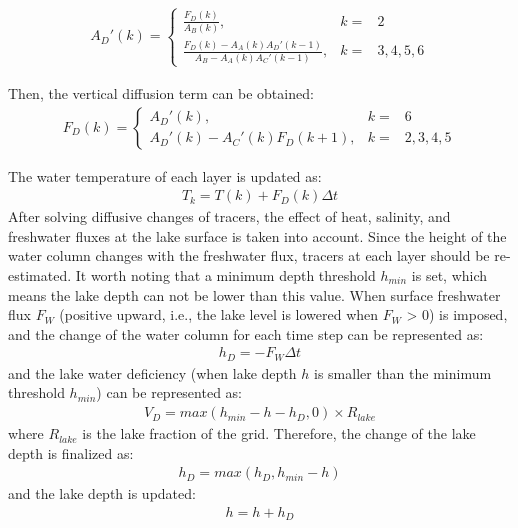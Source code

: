 \begin{eqnarray}
A_{D}'(k)=\left\{\begin{matrix}
\frac{F_{D}(k)}{A_{B}(k)}, &k=&2\\\frac{F_{D}(k)-A_{A}(k)A_{D}'(k-1)}{A_{B}-A_{A}(k)A_{C}'(k-1)}, &k=&3, 4, 5, 6
\end{matrix}\right.
\end{eqnarray}

Then, the vertical diffusion term can be obtained: \begin{eqnarray}
F_{D}(k)=\left\{\begin{matrix}
A_{D}'(k), &k=&6\\A_{D}'(k)-A_{C}'(k)F_{D}(k+1), &k=&2, 3, 4, 5
\end{matrix}\right.
\end{eqnarray}

The water temperature of each layer is updated as: \begin{eqnarray}
T_{k}=T(k)+F_{D}(k)\Delta t
\end{eqnarray} After solving diffusive changes of tracers, the effect of heat, salinity, and freshwater fluxes at the lake surface is taken into account. Since the height of the water column changes with the
freshwater flux, tracers at each layer should be re-estimated. It worth noting that a minimum depth threshold \(h_{min}\) is set, which means the lake depth can not be lower than this value. When
surface freshwater flux \(F_{W}\) (positive upward, i.e., the lake level is lowered when \(F_{W}\) \textgreater{} 0) is imposed, and the change of the water column for each time step can be
represented as: \begin{eqnarray}
h_{D}=-F_{W}\Delta t
\end{eqnarray} and the lake water deficiency (when lake depth \(h\) is smaller than the minimum threshold \(h_{min}\)) can be represented as: \begin{eqnarray}
V_{D}=max(h_{min}-h-h_{D}, 0)\times R_{lake}
\end{eqnarray} where \(R_{lake}\) is the lake fraction of the grid. Therefore, the change of the lake depth is finalized as: \begin{eqnarray}
h_{D}=max(h_{D}, h_{min}-h)
\end{eqnarray} and the lake depth is updated: \begin{eqnarray}
h=h+h_{D}
\end{eqnarray}

